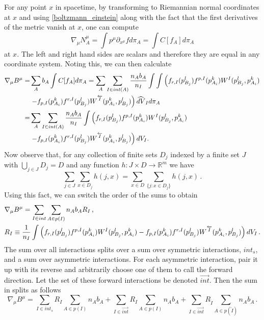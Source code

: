 For any point $x$ in spacetime,  by transforming to Riemannian normal coordinates at   $x$ and using \eqref{boltzmann_einstein} along with the fact that the first derivatives of the metric vanish at $x$,  one can compute
\begin{equation}\label{use_normal_coords}
\nabla_\mu N_A^\mu=\int p^\mu \partial_{x^\mu} f d\pi_A=\int C[f_A] d\pi_A
\end{equation}
at $x$. The left and right hand sides are scalars   and therefore they are equal in any coordinate system. Noting this, we can then calculate
\begin{align}
\nabla_\mu B^\mu=&\sum_A b_A\int C[f_A]d\pi_A=\sum_A\sum_{I\in int(A)} \frac{n_Ab_A}{n_I}\int\int\left(f_{r,I}(p_{B_j}^l)f^{p,I}(p_{A_i}^k)W^I(p_{B_j}^l,p_{A_i}^k) \right.\\
&\left. -f_{p,I}(p_{A_i}^k)f^{r,I}(p_{B_j}^l)W^{\overleftarrow{I}}(p_{A_i}^k,p_{B_j}^l)\right)\widehat{dV}_I d\pi_A\notag\\
=&\sum_A\sum_{I\in int(A)} \frac{n_Ab_A}{n_I}\int\left(f_{r,I}(p_{B_j}^l)f^{p,I}(p_{A_i}^k)W^I(p_{B_j}^l,p_{A_i}^k) \right.\notag\\
&\left. -f_{p,I}(p_{A_i}^k)f^{r,I}(p_{B_j}^l)W^{\overleftarrow{I}}(p_{A_i}^k,p_{B_j}^l)\right)  dV_I.\notag
\end{align}
Now observe that, for any collection of finite sets $D_j$ indexed by a finite set $J$ with $\bigcup_{j\in J}D_j=D$ and any function $h:J\times D\rightarrow \mathbb{R}^m$ we have
\begin{equation}\label{sum_lemma}
\sum_{j\in J}\sum_{x\in D_j} h(j,x)=\sum_{x\in D}\sum_{\{j:x\in D_j\}}h(j,x)\,.
\end{equation}
Using this fact, we can switch the order of the sums to obtain
\begin{align}\label{del_B}
&\nabla_\mu B^\mu=\sum_{I\in int}\sum_{A\in p(I)} n_Ab_A R_I \,,\\
&R_I\equiv \frac{1}{n_I}\int\left(f_{r,I}(p_{B_j}^l)f^{p,I}(p_{A_i}^k)W^I(p_{B_j}^l,p_{A_i}^k)  -f_{p,I}(p_{A_i}^k)f^{r,I}(p_{B_j}^l)W^{\overleftarrow{I}}(p_{A_i}^k,p_{B_j}^l)\right)  dV_I\,.\notag
\end{align}
The sum over all interactions splits over a sum over symmetric interactions, $int_{s}$, and a sum over asymmetric interactions.  For each asymmetric interaction, pair it up with its reverse and arbitrarily choose one of them to call the forward direction.  Let the set of these forward interactions be denoted $\overrightarrow{int}$.  Then the sum in  splits as follows
\begin{equation}
\nabla_\mu B^\mu=\sum_{I\in int_s}R_I\sum_{A\in p(I)} n_A b_A+\sum_{I\in\overrightarrow{int}}R_I\sum_{A\in p(I)} n_Ab_A+\sum_{I\in\overrightarrow{int}}R_{\overleftarrow{I}}\sum_{A\in p(\overleftarrow{I})} n_Ab_A\,.
\end{equation}
